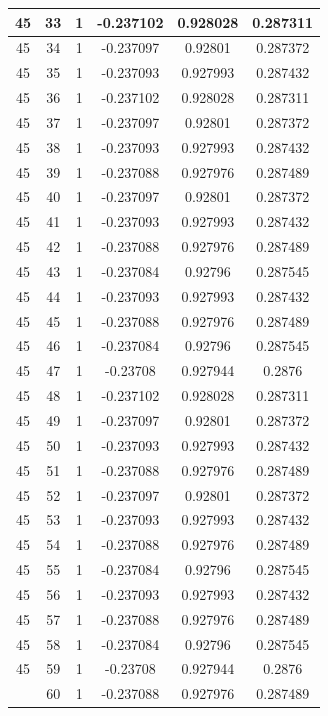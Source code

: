 \documentclass[12pt,a4paper]{article}
\numberwithin{equation}{section}
\numberwithin{figure}{section}
\numberwithin{table}{section}
\begin{document}
\begin{longtable}{|c|c|c|c|c|c|}
45 & 33 & 1 & -0.237102 & 0.928028 & 0.287311 \\ \hline
45 & 34 & 1 & -0.237097 & 0.92801 & 0.287372 \\ \hline
45 & 35 & 1 & -0.237093 & 0.927993 & 0.287432 \\ \hline
45 & 36 & 1 & -0.237102 & 0.928028 & 0.287311 \\ \hline
45 & 37 & 1 & -0.237097 & 0.92801 & 0.287372 \\ \hline
45 & 38 & 1 & -0.237093 & 0.927993 & 0.287432 \\ \hline
45 & 39 & 1 & -0.237088 & 0.927976 & 0.287489 \\ \hline
45 & 40 & 1 & -0.237097 & 0.92801 & 0.287372 \\ \hline
45 & 41 & 1 & -0.237093 & 0.927993 & 0.287432 \\ \hline
45 & 42 & 1 & -0.237088 & 0.927976 & 0.287489 \\ \hline
45 & 43 & 1 & -0.237084 & 0.92796 & 0.287545 \\ \hline
45 & 44 & 1 & -0.237093 & 0.927993 & 0.287432 \\ \hline
45 & 45 & 1 & -0.237088 & 0.927976 & 0.287489 \\ \hline
45 & 46 & 1 & -0.237084 & 0.92796 & 0.287545 \\ \hline
45 & 47 & 1 & -0.23708 & 0.927944 & 0.2876 \\ \hline
45 & 48 & 1 & -0.237102 & 0.928028 & 0.287311 \\ \hline
45 & 49 & 1 & -0.237097 & 0.92801 & 0.287372 \\ \hline
45 & 50 & 1 & -0.237093 & 0.927993 & 0.287432 \\ \hline
45 & 51 & 1 & -0.237088 & 0.927976 & 0.287489 \\ \hline
45 & 52 & 1 & -0.237097 & 0.92801 & 0.287372 \\ \hline
45 & 53 & 1 & -0.237093 & 0.927993 & 0.287432 \\ \hline
45 & 54 & 1 & -0.237088 & 0.927976 & 0.287489 \\ \hline
45 & 55 & 1 & -0.237084 & 0.92796 & 0.287545 \\ \hline
45 & 56 & 1 & -0.237093 & 0.927993 & 0.287432 \\ \hline
45 & 57 & 1 & -0.237088 & 0.927976 & 0.287489 \\ \hline
45 & 58 & 1 & -0.237084 & 0.92796 & 0.287545 \\ \hline
45 & 59 & 1 & -0.23708 & 0.927944 & 0.2876 \\ \hline
\pagebreak
45 & 60 & 1 & -0.237088 & 0.927976 & 0.287489 \\ \hline

\end{longtable}
\end{document}
